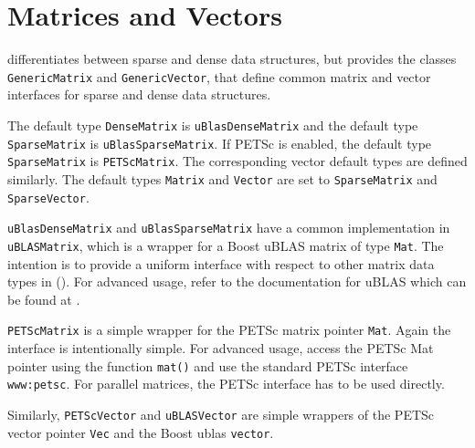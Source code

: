 \section{Matrices and Vectors}

\dolfin{} differentiates between sparse and dense data structures, but provides
the classes \texttt{GenericMatrix} and \texttt{GenericVector}, that define
common matrix and vector interfaces for sparse and dense data structures.

The default type \texttt{DenseMatrix} is \texttt{uBlasDenseMatrix} and the 
default type \texttt{SparseMatrix} is \texttt{uBlasSparseMatrix}. If PETSc is 
enabled, the default type \texttt{SparseMatrix} is  \texttt{PETScMatrix}. The 
corresponding vector default types are defined similarly. The default types 
\texttt{Matrix} and \texttt{Vector} are set to \texttt{SparseMatrix} and 
\texttt{SparseVector}.

\texttt{uBlasDenseMatrix} and \texttt{uBlasSparseMatrix} have
a common implementation in \texttt{uBLASMatrix}, which is a wrapper
for a Boost uBLAS matrix of type \texttt{Mat}.
The intention is to provide a uniform interface with respect to other
matrix data types in \dolfin().
For advanced usage, refer to the documentation for
uBLAS which can be found at \cite{www:ublas}.

\texttt{PETScMatrix} is a simple wrapper for the PETSc matrix
pointer \texttt{Mat}. Again the interface is intentionally simple.
For advanced usage, access the PETSc Mat pointer using the function
\texttt{mat()} and use the standard PETSc interface
\texttt{www:petsc}.
For parallel matrices, the PETSc interface has to be used directly.

Similarly, \texttt{PETScVector} and \texttt{uBLASVector} are
simple wrappers of the PETSc vector pointer \texttt{Vec} and
the Boost ublas \texttt{vector}.

